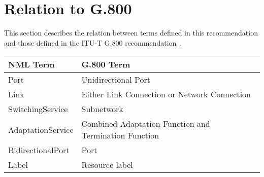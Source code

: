 
\section{Relation to G.800}%
\label{s:g800terms}

This section describes the relation between terms defined in this recommendation and those defined in the ITU-T G.800 recommendation~\cite{g800}.

\begin{tabular}{ll}
\hline
\textbf{NML Term} & \textbf{G.800 Term}\\
\hline
Port & Unidirectional Port \\
\hline
Link & Either Link Connection or Network Connection \\
\hline
SwitchingService & Subnetwork \\
\hline
AdaptationService & Combined Adaptation Function and Termination Function \\
\hline
BidirectionalPort & Port \\
\hline
Label & Resource label \\
\hline
\end{tabular}
